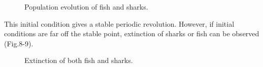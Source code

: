 \documentclass[aps,prl,preprint,superscriptaddress]{revtex4}
\begin{document}
\begin{figure}[H]
	\centering
	\caption{Population evolution of fish and sharks.}
	\label{more_clusters} 
\end{figure}

This initial condition gives a stable periodic revolution. However, if initial conditions are far off the stable point, extinction of sharks or fish can be observed (Fig.8-9).


\begin{figure}[H]
	\centering
	\caption{Extinction of both fish and sharks.}
	\label{more_clusters} 
\end{figure}
\end{document}
